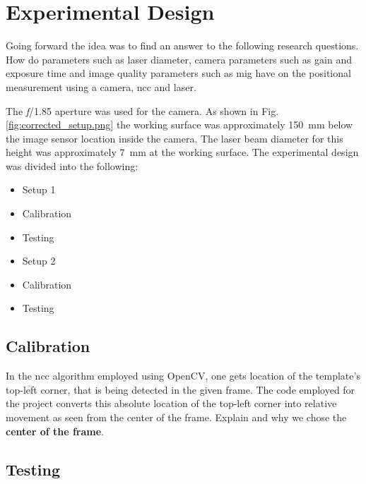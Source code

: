 \chapter{Experimental Design}

Going forward the idea was to find an answer to the following research questions. How do parameters such as laser diameter, camera parameters such as gain and exposure time and image quality parameters such as \gls{mig} have on the positional measurement using a camera, \gls{ncc} and laser. 

\vspace{5mm}

\noindent The \emph{f}/1.85 aperture was used for the camera. As shown in Fig. \ref{fig:corrected_setup.png} the working surface was approximately \SI{150}{\milli\meter} below the image sensor location inside the camera. The laser beam diameter for this height was approximately \SI{7}{\milli\meter} at the working surface. The experimental design was divided into the following:
\begin{itemize}
    \item Setup 1
    \item Calibration
    \item Testing
    \item Setup 2
    \item Calibration
    \item Testing
\end{itemize}

\section{Calibration}
In the \gls{ncc} algorithm employed using OpenCV, one gets location of the template's top-left corner, that is being detected in the given frame. The code employed for the project converts this absolute location of the top-left corner into relative movement as seen from the center of the frame. Explain  and why we chose the \textbf{center of the frame}.


\section{Testing}

